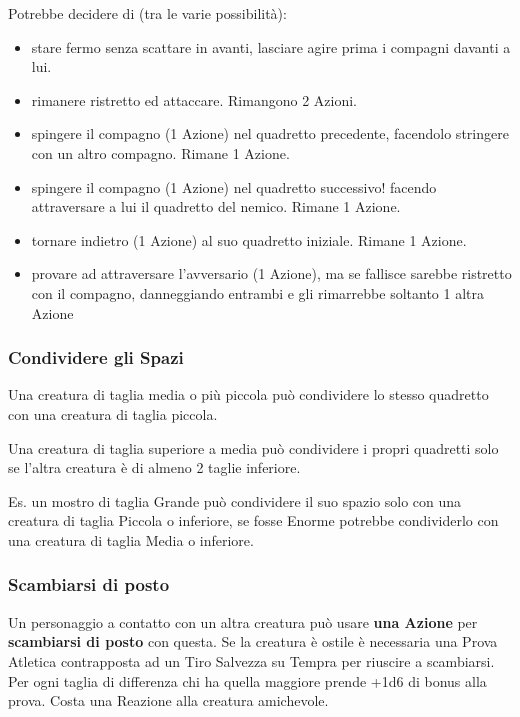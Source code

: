 \begin{multicols}{2}
\begin{changemargin}{0.3cm}{0.3cm}
\begin{tcolorbox}[title = Tups nel cunicolo]
Potrebbe decidere di (tra le varie possibilità):

\begin{itemize}[leftmargin=*] \setlength{\itemsep}{-1pt}
	\item stare fermo senza scattare in avanti, lasciare agire prima i compagni davanti a lui.
	\item rimanere ristretto ed attaccare. Rimangono 2 Azioni.
	\item spingere il compagno (1 Azione) nel quadretto precedente, facendolo stringere con un altro compagno. Rimane 1 Azione.
	\item spingere il compagno (1 Azione) nel quadretto successivo! facendo attraversare a lui il quadretto del nemico. Rimane 1 Azione.
	\item tornare indietro (1 Azione) al suo quadretto iniziale. Rimane 1 Azione.
	\item provare ad attraversare l'avversario (1 Azione), ma se fallisce sarebbe ristretto con il compagno, danneggiando entrambi e gli rimarrebbe soltanto 1 altra Azione
\end{itemize}

\end{tcolorbox}\end{changemargin}

\subsubsection{Condividere gli Spazi}\label{condividereglispazi}\hypertarget{condividereglispazi}{}

Una creatura di taglia media o più piccola può condividere lo stesso quadretto con una creatura di taglia piccola.

Una creatura di taglia superiore a media può condividere i propri quadretti solo se l'altra creatura è di almeno 2 taglie inferiore.

Es. un mostro di taglia Grande può condividere il suo spazio solo con una creatura di taglia Piccola o inferiore, se fosse Enorme potrebbe condividerlo con una creatura di taglia Media o inferiore.

\subsubsection{Scambiarsi di posto}
Un personaggio a contatto con un altra creatura può usare \textbf{una Azione} per \textbf{scambiarsi di posto} con questa. Se la creatura è ostile è necessaria una Prova Atletica contrapposta ad un Tiro Salvezza su Tempra per riuscire a scambiarsi. Per ogni taglia di differenza chi ha quella maggiore prende +1d6 di bonus alla prova. Costa una Reazione alla creatura amichevole.


\end{multicols}
